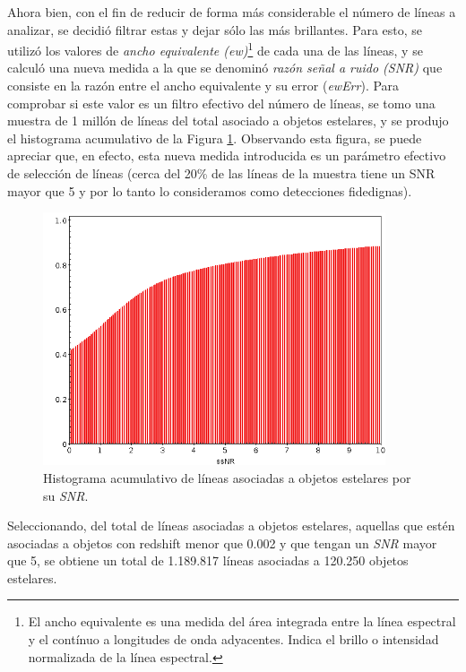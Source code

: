 Ahora bien, con el fin de reducir de forma más considerable el número de líneas a analizar, se decidió filtrar estas y dejar sólo las más brillantes. Para esto, se utilizó los valores de \textit{ancho equivalente (ew)}\footnote{El ancho equivalente es una medida del área integrada entre la línea espectral y el contínuo a longitudes de onda adyacentes. Indica el brillo o intensidad normalizada de la línea espectral.} de cada una de las líneas, y se calculó una nueva medida a la que se denominó \textit{razón señal a ruido (SNR)} que consiste en la razón entre el ancho equivalente y su error (\textit{ewErr}). Para comprobar si este valor es un filtro efectivo del número de líneas, se tomo una muestra de 1 millón de líneas del total asociado a objetos estelares, y se produjo el histograma acumulativo de la Figura \ref{fig:stelar_obj_snr}. Observando esta figura, se puede apreciar que, en efecto, esta nueva medida introducida es un parámetro efectivo de selección de líneas (cerca del 20\% de las líneas de la muestra tiene un SNR mayor que 5 y por lo tanto lo consideramos como detecciones fidedignas).

\begin{figure}[h!]
\begin{center}
\includegraphics[width=0.9\textwidth]{imagenes/stelar_obj_snr_hist.png}
\end{center}
\vspace*{-5mm}
\caption{Histograma acumulativo de líneas asociadas a objetos estelares por su \textit{SNR}.}
\label{fig:stelar_obj_snr}
\end{figure}

Seleccionando, del total de líneas asociadas a objetos estelares, aquellas que estén asociadas a objetos con redshift menor que 0.002 y que tengan un \textit{SNR} mayor que 5, se obtiene un total de 1.189.817 líneas asociadas a 120.250 objetos estelares. 

